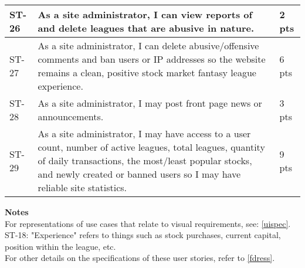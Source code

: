 \begin{longtable}{|p{0.6in}|p{4.6in}|p{0.5in}|}
ST-26&As a site administrator, I can view reports of and delete leagues that are abusive in nature.&2 pts  \\ \hline 
ST-27&As a site administrator, I can delete abusive/offensive comments and ban users or IP addresses so the website remains a clean, positive stock market fantasy league experience.&6 pts  \\ \hline 
ST-28&As a site administrator, I may post front page news or announcements.&3 pts  \\ \hline 
ST-29&As a site administrator, I may have access to a user count, number of active leagues, total leagues, quantity of daily transactions, the most/least popular stocks, and newly created or banned users so I may have reliable site statistics. &9 pts \\ \hline 
\end{longtable}

\textbf{Notes}\\
For representations of use cases that relate to visual requirements, see: \ref{uispec}.\\
ST-18: "Experience" refers to things such as stock purchases, current capital, position within the league, etc.\\
For other details on the specifications of these user stories, refer to \ref{fdress}.\\